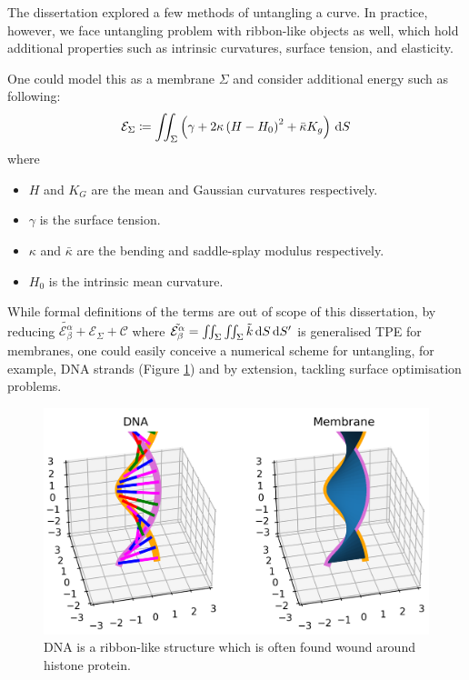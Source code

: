 \documentclass[../dissertation.tex]{subfiles}
\begin{document}
The dissertation explored a few methods of untangling a curve.
In practice, however, we face untangling problem with ribbon-like objects as well,
which hold additional properties such as intrinsic curvatures, surface tension, and elasticity.

One could model this as a membrane $\Sigma$ and consider additional energy such as following\cite{mmb}:
\begin{equation}
    \mathcal{E}_{\Sigma} \coloneqq \iint_{\Sigma} \left( \gamma + 2 \kappa \left( H-H_0 \right)^2 + \bar \kappa K_g \right) \, \text{d} S
\end{equation}
where
\begin{itemize}
    \item $H$ and $K_G$ are the mean and Gaussian curvatures respectively.
    \item $\gamma$ is the surface tension.
    \item $\kappa$ and $\bar \kappa$ are the bending and saddle-splay modulus respectively.
    \item $H_0$ is the intrinsic mean curvature.
\end{itemize}
While formal definitions of the terms are out of scope of this dissertation,
by reducing $\tilde{\mathcal{E}_{\beta}^{\alpha}} + \mathcal{E}_{\Sigma} + \mathcal{C}$ where $\tilde{\mathcal{E}_{\beta}^{\alpha}} = \iint_{\Sigma} \iint_{\Sigma} \tilde{k} \, \text{d} S \, \text{d} S'$ is generalised TPE for membranes,
one could easily conceive a numerical scheme for untangling, for example, DNA strands (Figure \ref{fig: DNA}) and by extension, tackling surface optimisation problems.

\begin{figure}[tbp]
    \centering
    \includegraphics[scale=0.7]{sections/MembraneImgs/dnaMembrane}
    \caption{DNA is a ribbon-like structure which is often found wound around histone protein.\cite{gilchrist_2023}}
    \label{fig: DNA}
\end{figure}

\end{document}
